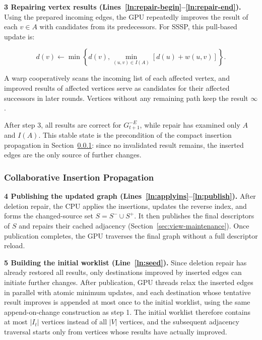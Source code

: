 \textbf{3 Repairing vertex results (Lines~\ref{ln:repair-begin}--\ref{ln:repair-end}).} Using the prepared incoming edges, the GPU repeatedly improves the result of each $v\in A$ with candidates from its predecessors. For SSSP, this pull-based update is:

\begin{equation}
d(v)\leftarrow\min\left\{d(v),
\min_{(u,v)\in I(A)}[d(u)+w(u,v)]\right\}.
\label{eq:pull}
\end{equation}

A warp cooperatively scans the incoming list of each affected vertex, and improved results of affected vertices serve as candidates for their affected successors in later rounds. Vertices without any remaining path keep the result $\infty$.

After step 3, all results are correct for $G_{t+1}^{-E}$, while repair has examined only $A$ and $I(A)$. This stable state is the precondition of the compact insertion propagation in Section~\ref{sec:insertion-propagation}: since no invalidated result remains, the inserted edges are the only source of further changes.

\subsubsection{Collaborative Insertion Propagation}
\label{sec:insertion-propagation}

\textbf{4 Publishing the updated graph (Lines~\ref{ln:applyins}--\ref{ln:publish}).} After deletion repair, the CPU applies the insertions, updates the reverse index, and forms the changed-source set $S=S^-\cup S^+$. It then publishes the final descriptors of $S$ and repairs their cached adjacency (Section~\ref{sec:view-maintenance}). Once publication completes, the GPU traverses the final graph without a full descriptor reload.

\textbf{5 Building the initial worklist (Line~\ref{ln:seed}).} Since deletion repair has already restored all results, only destinations improved by inserted edges can initiate further changes. After publication, GPU threads relax the inserted edges in parallel with atomic minimum updates, and each destination whose tentative result improves is appended at most once to the initial worklist, using the same append-on-change construction as step 1. The initial worklist therefore contains at most $|I_t|$ vertices instead of all $|V|$ vertices, and the subsequent adjacency traversal starts only from vertices whose results have actually improved.

